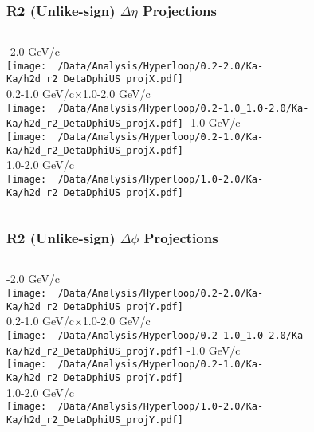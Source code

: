 \documentclass{beamer}
\begin{document}
\begin{frame}
	\frametitle{R2 (Unlike-sign) $\Delta\eta$ Projections}
	\begin{columns}
		-2.0 GeV/c\\
		\texttt{[image: ~/Data/Analysis/Hyperloop/0.2-2.0/Ka-Ka/h2d\_r2\_DetaDphiUS\_projX.pdf]}\\0.2-1.0 GeV/c$\times$1.0-2.0 GeV/c\\
		\texttt{[image: ~/Data/Analysis/Hyperloop/0.2-1.0\_1.0-2.0/Ka-Ka/h2d\_r2\_DetaDphiUS\_projX.pdf]}
		-1.0 GeV/c\\
		\texttt{[image: ~/Data/Analysis/Hyperloop/0.2-1.0/Ka-Ka/h2d\_r2\_DetaDphiUS\_projX.pdf]}\\1.0-2.0 GeV/c\\
		\texttt{[image: ~/Data/Analysis/Hyperloop/1.0-2.0/Ka-Ka/h2d\_r2\_DetaDphiUS\_projX.pdf]}
	\end{columns}
\end{frame}
\begin{frame}
	\frametitle{R2 (Unlike-sign) $\Delta\phi$ Projections}
	\begin{columns}
		\column{0.5\textwidth}
		-2.0 GeV/c\\
		\texttt{[image: ~/Data/Analysis/Hyperloop/0.2-2.0/Ka-Ka/h2d\_r2\_DetaDphiUS\_projY.pdf]}\\0.2-1.0 GeV/c$\times$1.0-2.0 GeV/c\\
		\texttt{[image: ~/Data/Analysis/Hyperloop/0.2-1.0\_1.0-2.0/Ka-Ka/h2d\_r2\_DetaDphiUS\_projY.pdf]}
		\column{0.5\textwidth}
		-1.0 GeV/c\\
		\texttt{[image: ~/Data/Analysis/Hyperloop/0.2-1.0/Ka-Ka/h2d\_r2\_DetaDphiUS\_projY.pdf]}\\1.0-2.0 GeV/c\\
		\texttt{[image: ~/Data/Analysis/Hyperloop/1.0-2.0/Ka-Ka/h2d\_r2\_DetaDphiUS\_projY.pdf]}
	\end{columns}
\end{frame}
\end{document}
